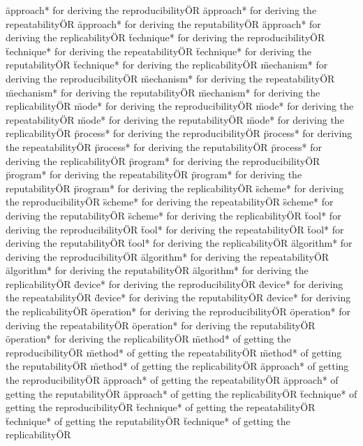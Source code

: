 \documentclass[
10pt, %
a4paper, %
oneside, %
headinclude,footinclude, %
BCOR5mm, %
]{scrartcl}
\begin{document}
\"approach* for deriving the reproducibility\" OR \"approach* for deriving the repeatability\" OR \"approach* for deriving the reputability\" OR \"approach* for deriving the replicability\" OR 
\"technique* for deriving the reproducibility\" OR \"technique* for deriving the repeatability\" OR \"technique* for deriving the reputability\" OR \"technique* for deriving the replicability\" OR 
\"mechanism* for deriving the reproducibility\" OR \"mechanism* for deriving the repeatability\" OR \"mechanism* for deriving the reputability\" OR \"mechanism* for deriving the replicability\" OR 
\"mode* for deriving the reproducibility\" OR \"mode* for deriving the repeatability\" OR \"mode* for deriving the reputability\" OR \"mode* for deriving the replicability\" OR 
\"process* for deriving the reproducibility\" OR \"process* for deriving the repeatability\" OR \"process* for deriving the reputability\" OR \"process* for deriving the replicability\" OR 
\"program* for deriving the reproducibility\" OR \"program* for deriving the repeatability\" OR \"program* for deriving the reputability\" OR \"program* for deriving the replicability\" OR 
\"scheme* for deriving the reproducibility\" OR \"scheme* for deriving the repeatability\" OR \"scheme* for deriving the reputability\" OR \"scheme* for deriving the replicability\" OR 
\"tool* for deriving the reproducibility\" OR \"tool* for deriving the repeatability\" OR \"tool* for deriving the reputability\" OR \"tool* for deriving the replicability\" OR 
\"algorithm* for deriving the reproducibility\" OR \"algorithm* for deriving the repeatability\" OR \"algorithm* for deriving the reputability\" OR \"algorithm* for deriving the replicability\" OR 
\"device* for deriving the reproducibility\" OR \"device* for deriving the repeatability\" OR \"device* for deriving the reputability\" OR \"device* for deriving the replicability\" OR 
\"operation* for deriving the reproducibility\" OR \"operation* for deriving the repeatability\" OR \"operation* for deriving the reputability\" OR \"operation* for deriving the replicability\" OR 
\"method* of getting the reproducibility\" OR \"method* of getting the repeatability\" OR \"method* of getting the reputability\" OR \"method* of getting the replicability\" OR 
\"approach* of getting the reproducibility\" OR \"approach* of getting the repeatability\" OR \"approach* of getting the reputability\" OR \"approach* of getting the replicability\" OR 
\"technique* of getting the reproducibility\" OR \"technique* of getting the repeatability\" OR \"technique* of getting the reputability\" OR \"technique* of getting the replicability\" OR 
\end{document}
